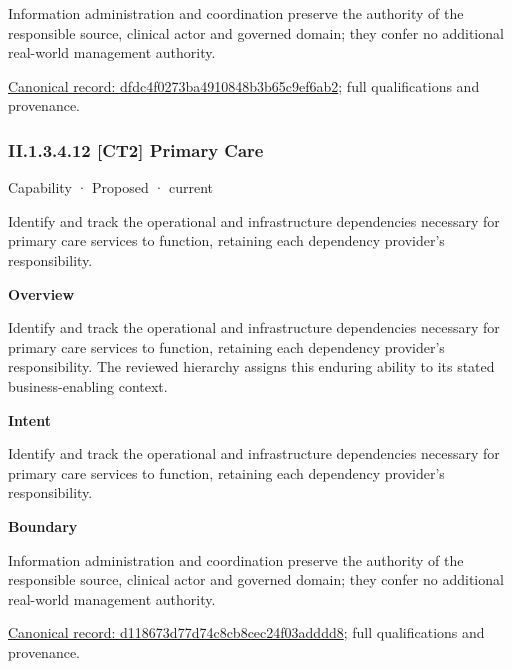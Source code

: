 Information administration and coordination preserve the authority of the responsible source, clinical actor and governed domain; they confer no additional real-world management authority.


{\footnotesize \href{../../../../continuum/strategy/capability/dfdc4f0273ba4910848b3b65c9ef6ab2.md}{Canonical record: dfdc4f0273ba4910848b3b65c9ef6ab2}; full qualifications and provenance.}\par
\subsubsection*{II.1.3.4.12 [CT2] Primary Care}
\label{navigation:II.1.3.4.12}

\label{element:d118673d77d74c8cb8cec24f03adddd8}
{\small Capability · Proposed · current}\par

Identify and track the operational and infrastructure dependencies necessary for primary care services to function, retaining each dependency provider's responsibility.



\textbf{Overview}



Identify and track the operational and infrastructure dependencies necessary for primary care services to function, retaining each dependency provider's responsibility. The reviewed hierarchy assigns this enduring ability to its stated business-enabling context.



\textbf{Intent}



Identify and track the operational and infrastructure dependencies necessary for primary care services to function, retaining each dependency provider's responsibility.



\textbf{Boundary}



Information administration and coordination preserve the authority of the responsible source, clinical actor and governed domain; they confer no additional real-world management authority.


{\footnotesize \href{../../../../continuum/strategy/capability/d118673d77d74c8cb8cec24f03adddd8.md}{Canonical record: d118673d77d74c8cb8cec24f03adddd8}; full qualifications and provenance.}\par
